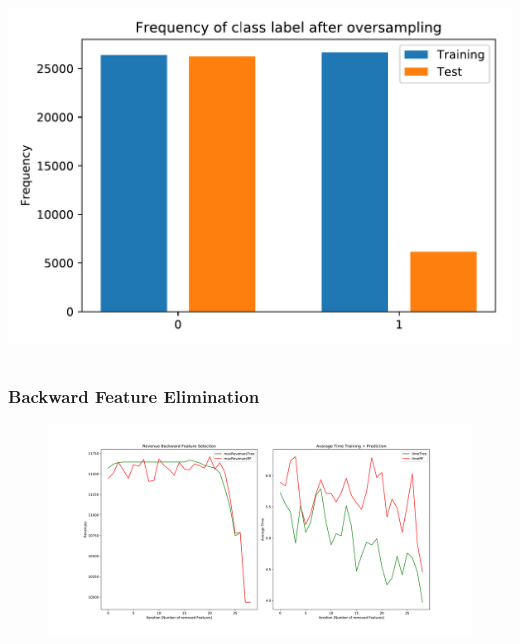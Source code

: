 \documentclass{beamer}
\begin{document}
\begin{frame}
\begin{columns}[c]
\begin{center}
\includegraphics[width=.8\textwidth]{pdf/oversampled.pdf}
\end{center}
\end{columns}
\end{frame}



%
\begin{frame}
\frametitle{Backward Feature Elimination}
\begin{figure}
\begin{center}
\includegraphics[width=1.0\textwidth]{pdf/backwardSpark.pdf}
\end{center}
\end{figure}
\end{frame}
\end{document}
